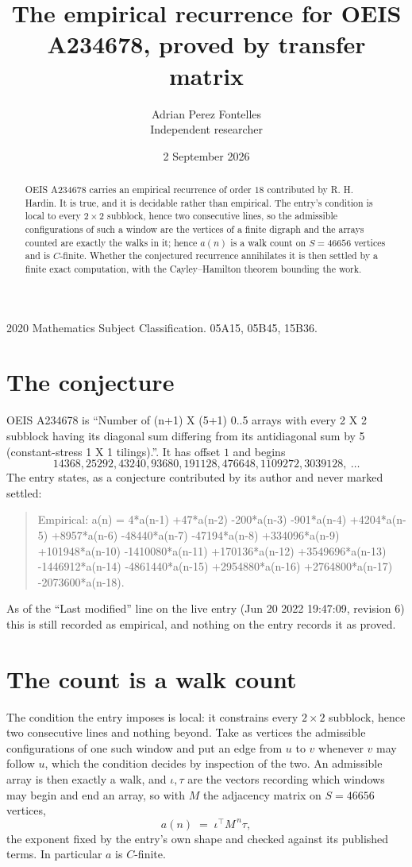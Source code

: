 \documentclass[11pt,a4paper]{article}
\title{The empirical recurrence for OEIS A234678, proved by transfer matrix}
\author{Adrian Perez Fontelles\\ \small Independent researcher}
\date{2 September 2026}
\theoremstyle{plain}
\theoremstyle{definition}
\begin{document}
\maketitle

\begin{abstract}
OEIS A234678 carries an empirical recurrence of order $18$ contributed by R. H. Hardin. It is
true, and it is decidable rather than empirical. The entry's condition is local to every $2\times2$ subblock, hence two consecutive lines, so
the admissible configurations of such a window are the vertices of a finite digraph and the
arrays counted are exactly the walks in it; hence $a(n)$ is a walk count on $S=46656$ vertices
and is $C$-finite. Whether the conjectured recurrence annihilates it is then settled by a
finite exact computation, with the Cayley--Hamilton theorem bounding the work.
\end{abstract}

\noindent\small 2020 Mathematics Subject Classification. 05A15, 05B45, 15B36.\normalsize

\section{The conjecture}

OEIS A234678 is ``Number of (n+1) X (5+1) 0..5 arrays with every 2 X 2 subblock having its diagonal sum differing from its antidiagonal sum by 5 (constant-stress 1 X 1 tilings).''. It has offset $1$ and begins
\[
14368, 25292, 43240, 93680, 191128, 476648, 1109272, 3039128,\ \dots
\]
The entry states, as a conjecture contributed by its author and never marked settled:
\begin{quote}
Empirical: a(n) = 4*a(n-1) +47*a(n-2) -200*a(n-3) -901*a(n-4) +4204*a(n-5) +8957*a(n-6) -48440*a(n-7) -47194*a(n-8) +334096*a(n-9) +101948*a(n-10) -1410080*a(n-11) +170136*a(n-12) +3549696*a(n-13) -1446912*a(n-14) -4861440*a(n-15) +2954880*a(n-16) +2764800*a(n-17) -2073600*a(n-18).
\end{quote}
As of the ``Last modified'' line on the live entry (Jun 20 2022 19:47:09, revision 6) this is still
recorded as empirical, and nothing on the entry records it as proved.

\section{The count is a walk count}

The condition the entry imposes is local: it constrains every $2\times2$ subblock, hence two consecutive lines and nothing beyond. Take as vertices the admissible configurations of one such window and put an edge from $u$ to $v$ whenever $v$ may follow $u$, which the condition decides by inspection of the two.
An admissible array is then exactly a walk, and $\iota,\tau$ are the vectors recording which windows may begin and end an array, so with $M$ the adjacency matrix on $S=46656$ vertices,
\[
a(n)\;=\;\iota^{\!\top}M^{\,n}\tau ,
\]
the exponent fixed by the entry's own shape and checked against its published terms. In
particular $a$ is $C$-finite.
\end{document}
